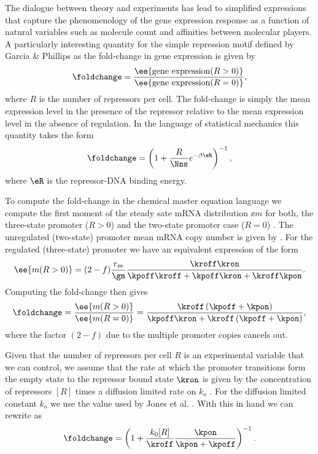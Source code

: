 The dialogue between theory and experiments has lead to simplified expressions
that capture the phenomenology of the gene expression response as a function of
natural variables such as molecule count and affinities between molecular
players. A particularly interesting quantity for the simple repression motif
defined by Garcia \& Phillips \cite{Garcia2011c} as the fold-change in gene
expression is given by
\begin{equation}
  \foldchange = {\ee{\text{gene expression}(R > 0)} \over
                 \ee{\text{gene expression}(R = 0)}},
\end{equation}
where $R$ is the number of repressors per cell. The fold-change is simply the
mean expression level in the presence of the repressor relative to the mean
expression level in the absence of regulation. In the language of statistical
mechanics this quantity takes the form \cite{Garcia2011c}
\begin{equation}
  \foldchange = \left( 1 + {R \over \Nns} e^{-\beta\eR} \right)^{-1},
  \label{seq_fc_thermo}
\end{equation}
where $\eR$ is the repressor-DNA binding energy.

To compute the fold-change in the chemical master equation language we compute
the first moment of the steady sate mRNA distribution $\ee{m}$ for both, the
three-state promoter ($R>0$) and the two-state promoter case ($R=0$)
. The unregulated (two-state) promoter
mean mRNA copy number is given by . For the
regulated (three-state) promoter we have an equivalent expression of the form
\begin{equation}
  \ee{m (R > 0)} = (2 - f){r_m \over \gm} {\kroff\kron
  \over \kpoff\kroff + \kpoff\kron + \kroff\kpon}.
\end{equation}
Computing the fold-change then gives
\begin{equation}
  \foldchange = {\ee{m (R > 0)} \over \ee{m (R = 0)}} =
  {\kroff \left( \kpoff + \kpon \right) \over
  \kpoff\kron + \kroff \left( \kpoff + \kpon \right)},
  \label{seq_fold_change_cme}
\end{equation}
where the factor $(2 -f)$ due to the multiple promoter copies cancels out.

Given that the number of repressors per cell $R$ is an experimental variable
that we can control, we assume that the rate at which the promoter transitions
form the empty state to the repressor bound state $\kron$ is given by the
concentration of repressors $[R]$ times a diffusion limited rate on $k_o$
\cite{Jones2014a}.  For the diffusion limited constant $k_o$ we use the value
used by Jones et al. \cite{Jones2014a} . With this in hand we can rewrite
 as
\begin{equation}
  \foldchange = \left( 1 + {k_0 [R] \over \kroff}
                {\kpon \over \kpon + \kpoff} \right)^{-1}.
  \label{seq_fc_kinetic}
\end{equation}

